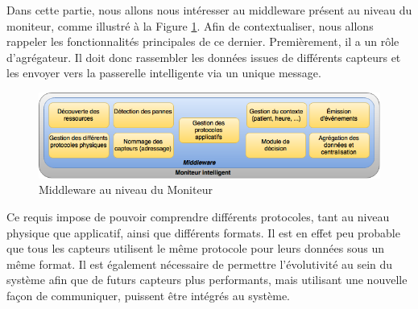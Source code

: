 Dans cette partie, nous allons nous intéresser au middleware présent au niveau du moniteur, comme illustré à la Figure \ref{4}. Afin de contextualiser, nous allons rappeler les fonctionnalités principales de ce dernier. Premièrement, il a un rôle d'agrégateur. Il doit donc rassembler les données issues de différents capteurs et les envoyer vers la passerelle intelligente via un unique message. 
\newline
\begin{figure}[h!]
	\hspace*{-3cm}
	\centering
	\includegraphics[width=1.5\textwidth]{Figure4.png}
	\caption{Middleware au niveau du Moniteur}
	\label{4}
\end{figure}

Ce requis impose de pouvoir comprendre différents protocoles, tant au niveau physique que applicatif, ainsi que différents formats. Il est en effet peu probable que tous les capteurs utilisent le même protocole pour leurs données sous un même format. Il est également nécessaire de permettre l'évolutivité au sein du système afin que de futurs capteurs plus performants, mais utilisant une nouvelle façon de communiquer, puissent être intégrés au système.
\newline

